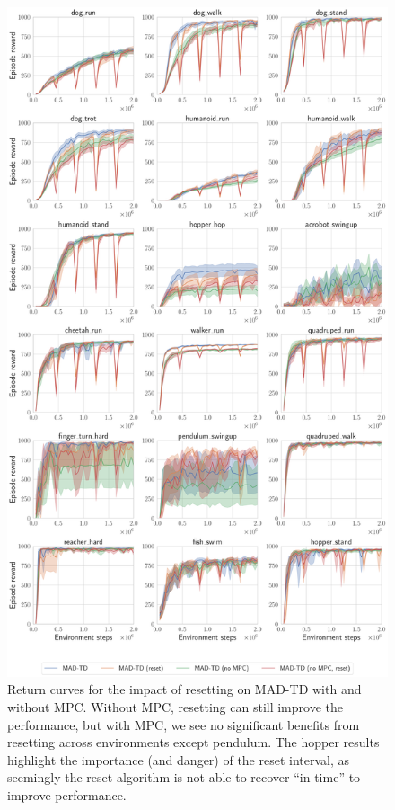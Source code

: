 \begin{figure}[H]
    \centering
    \includegraphics[width=0.8\linewidth]{figures/mad-td/mpc_reset.pdf}
    \caption{Return curves for the impact of resetting on MAD-TD with and without MPC. Without MPC, resetting can still improve the performance, but with MPC, we see no significant benefits from resetting across environments except pendulum. The hopper results highlight the importance (and danger) of the reset interval, as seemingly the reset algorithm is not able to recover ``in time'' to improve performance.}
    \label{fig:mad:mpc_comp}
\end{figure}

